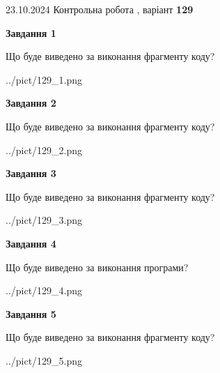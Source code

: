 \documentclass[12pt, ukrainian]{article}
\begin{document}
{\Large{23.10.2024 Контрольна робота , варіант  \No \textbf { 129 }\par}}
{
\begin {large}
{\begin {center}\textbf{Завдання 1}\end {center}}

Що буде виведено за виконання фрагменту коду?\par
\begin{center}
	{../pict/129_1.png}
\end{center}
\newpage

{\begin {center}\textbf{Завдання 2}\end {center}}

Що буде виведено за виконання фрагменту коду?\par
\begin{center}
	{../pict/129_2.png}
\end{center}
\newpage

{\begin {center}\textbf{Завдання 3}\end {center}}

Що буде виведено за виконання фрагменту коду?\par
\begin{center}
	{../pict/129_3.png}
\end{center}
\newpage

{\begin {center}\textbf{Завдання 4}\end {center}}

Що буде виведено за виконання програми?\par
\begin{center}
	{../pict/129_4.png}
\end{center}
\newpage

{\begin {center}\textbf{Завдання 5}\end {center}}

Що буде виведено за виконання фрагменту коду?\par
\begin{center}
	{../pict/129_5.png}
\end{center}
\newpage


\end{large}}
\end{document}
